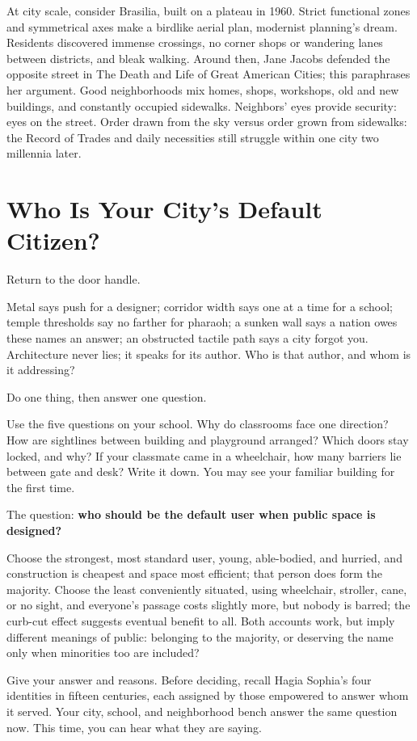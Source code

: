 At city scale, consider Brasilia, built on a plateau in 1960. Strict functional zones and symmetrical axes make a birdlike aerial plan, modernist planning's dream. Residents discovered immense crossings, no corner shops or wandering lanes between districts, and bleak walking. Around then, Jane Jacobs defended the opposite street in The Death and Life of Great American Cities; this paraphrases her argument. Good neighborhoods mix homes, shops, workshops, old and new buildings, and constantly occupied sidewalks. Neighbors' eyes provide security: eyes on the street. Order drawn from the sky versus order grown from sidewalks: the Record of Trades and daily necessities still struggle within one city two millennia later.

\section{Who Is Your City's Default Citizen?}
Return to the door handle.

Metal says push for a designer; corridor width says one at a time for a school; temple thresholds say no farther for pharaoh; a sunken wall says a nation owes these names an answer; an obstructed tactile path says a city forgot you. Architecture never lies; it speaks for its author. Who is that author, and whom is it addressing?

Do one thing, then answer one question.

Use the five questions on your school. Why do classrooms face one direction? How are sightlines between building and playground arranged? Which doors stay locked, and why? If your classmate came in a wheelchair, how many barriers lie between gate and desk? Write it down. You may see your familiar building for the first time.

The question: \textbf{who should be the default user when public space is designed?}

Choose the strongest, most standard user, young, able-bodied, and hurried, and construction is cheapest and space most efficient; that person does form the majority. Choose the least conveniently situated, using wheelchair, stroller, cane, or no sight, and everyone's passage costs slightly more, but nobody is barred; the curb-cut effect suggests eventual benefit to all. Both accounts work, but imply different meanings of public: belonging to the majority, or deserving the name only when minorities too are included?

Give your answer and reasons. Before deciding, recall Hagia Sophia's four identities in fifteen centuries, each assigned by those empowered to answer whom it served. Your city, school, and neighborhood bench answer the same question now. This time, you can hear what they are saying.

